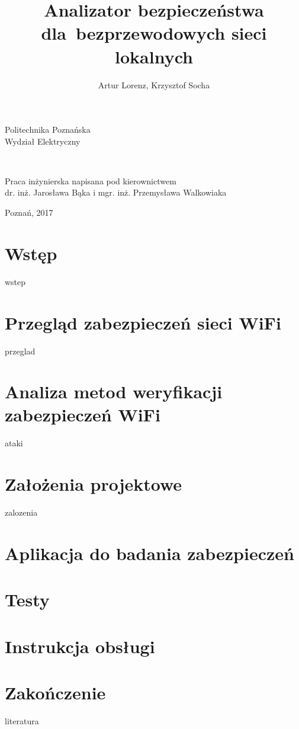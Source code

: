 \documentclass[12pt,a4paper,twoside]{report}
\author{Artur Lorenz, Krzysztof Socha}
\title{Analizator bezpieczeństwa dla~bezprzewodowych sieci lokalnych}
\makeatletter
\renewcommand{\maketitle}{\begin{titlepage}
    \vspace*{1cm}
    \begin{center}
    	Politechnika Poznańska\\
    	Wydział Elektryczny\\
    \end{center}
    \vspace{3cm}

    \begin{center}
     \LARGE\textsc{\@author}\\
      \LARGE\textbf{\textsc{\@title}} 
    \end{center}
    \vspace{0.5cm}
    \begin{flushright}

    \vspace{9cm}
     {\small Praca inżynierska
napisana pod kierownictwem}\\
         dr. inż. Jarosława Bąka i mgr. inż. Przemysława Walkowiaka
     \end{flushright}
    \vspace*{\stretch{6}}
    \begin{center}
    Poznań, 2017
    \end{center}
  \end{titlepage}%
}
\makeatother
\begin{document}
	\maketitle
	\tableofcontents
	\pagestyle{plain}
	\chapter*{Wstęp}
		{wstep}
	\chapter{Przegląd zabezpieczeń sieci WiFi}
		{przeglad}
	\chapter{Analiza metod weryfikacji zabezpieczeń WiFi}
		{ataki}
	\chapter{Założenia projektowe}
		{zalozenia}
	\chapter{Aplikacja do badania zabezpieczeń}
	\chapter{Testy}
	\chapter{Instrukcja obsługi}
	\chapter*{Zakończenie}
	{literatura}
\end{document}
